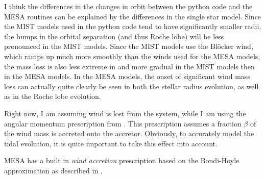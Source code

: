 \documentclass[a4paper,10pt]{article}
\begin{document}
\begin{figure}[ht]
    \centering
\end{figure}

I think the differences in the changes in orbit between the python code and the MESA routines can be explained by the differences in the single star model. Since the MIST models used in the python code tend to have significantly smaller radii, the bumps in the orbital separation (and thus Roche lobe) will be less pronounced in the MIST models. Since the MIST models use the Bl\"ocker wind, which ramps up much more smoothly than the \citet{vassiliadis1993} winds used for the MESA models, the mass loss is also less extreme in and more gradual in the MIST models then in the MESA models. In the MESA models, the onset of significant wind mass loss can actually quite clearly be seen in both the stellar radius evolution, as well as in the Roche lobe evolution.


Right now, I am assuming wind is lost from the system, while I am using the angular momentum prescription from \citet{saladino2019}. This prescription assumes a fraction \(\beta \) of the wind mass is accreted onto the accretor.
Obviously, to accurately model the tidal evolution, it is quite important to take this effect into account.

MESA has a built in \emph{wind accretion} prescription based on the Bondi-Hoyle approximation as described in \citet{hurley1902}. 
\end{document}
